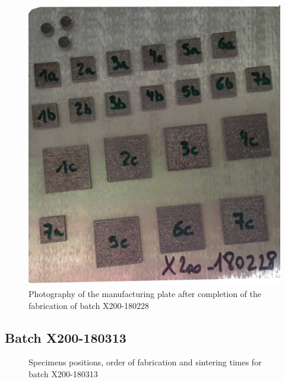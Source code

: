 \begin{figure}[h!]
\centering
\includegraphics[angle=180,scale=0.22]{Images/180228-real}
\decoRule
\caption[Photography of the manufacturing plate after completion of the fabrication of batch X200-180228]{Photography of the manufacturing plate after completion of the fabrication of batch X200-180228}
\label{fig:180228-real}
\end{figure}

\newpage
\subsection{Batch X200-180313}

\begin{figure}[ht]
\centering
\noindent{}
\decoRule
\caption[Specimens positions, order of fabrication and sintering times for batch X200-180313]{Specimens positions, order of fabrication and sintering times for batch X200-180313}
\label{fig:180313-cad}
\end{figure}

